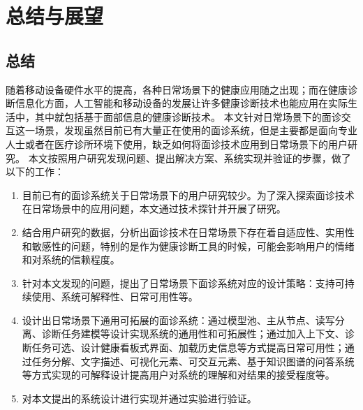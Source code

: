\chapter{总结与展望}
\section{总结}
随着移动设备硬件水平的提高，各种日常场景下的健康应用随之出现；而在健康诊断信息化方面，人工智能和移动设备的发展让许多健康诊断技术也能应用在实际生活中，其中就包括基于面部信息的健康诊断技术。
本文针对日常场景下的面诊交互这一场景，发现虽然目前已有大量正在使用的面诊系统，但是主要都是面向专业人士或者在医疗诊所环境下使用，缺乏如何将面诊技术应用到日常场景下的用户研究。
本文按照用户研究发现问题、提出解决方案、系统实现并验证的步骤，做了以下的工作：
\begin{enumerate}
	\item 目前已有的面诊系统关于日常场景下的用户研究较少。为了深入探索面诊技术在日常场景中的应用问题，本文通过技术探针并开展了研究。
	
	\item 结合用户研究的数据，分析出面诊技术在日常场景下存在着自适应性、实用性和敏感性的问题，特别的是作为健康诊断工具的时候，可能会影响用户的情绪和对系统的信赖程度。
	
	\item 针对本文发现的问题，提出了日常场景下面诊系统对应的设计策略：支持可持续使用、系统可解释性、日常可用性等。

	\item 设计出日常场景下通用可拓展的面诊系统：通过模型池、主从节点、读写分离、诊断任务建模等设计实现系统的通用性和可拓展性；通过加入上下文、诊断任务可选、设计健康看板式界面、加载历史信息等方式提高日常可用性；通过任务分解、文字描述、可视化元素、可交互元素、基于知识图谱的问答系统等方式实现的可解释设计提高用户对系统的理解和对结果的接受程度等。

	\item 对本文提出的系统设计进行实现并通过实验进行验证。
\end{enumerate}




